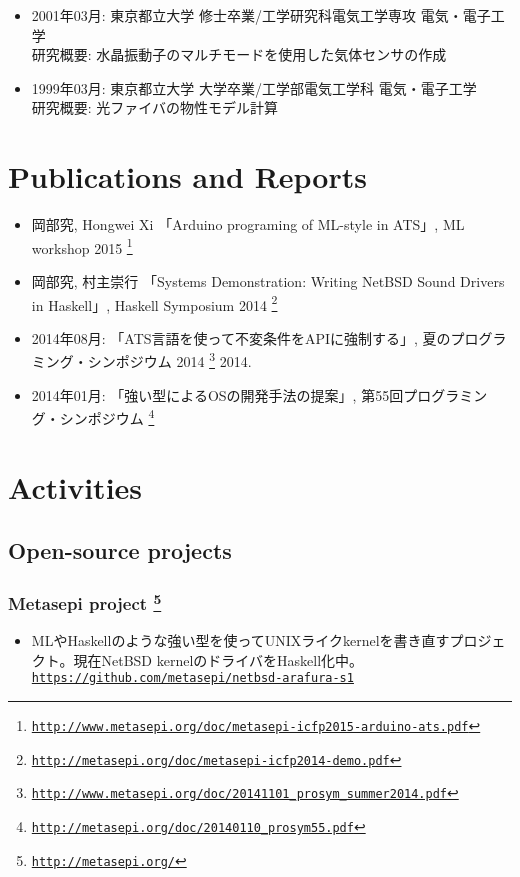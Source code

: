 \documentclass[letterpaper]{article}
\begin{document}
\begin{itemize}
  \item 2001年03月: 東京都立大学 修士卒業/工学研究科電気工学専攻 電気・電子工学 \\
    研究概要: 水晶振動子のマルチモードを使用した気体センサの作成
  \item 1999年03月: 東京都立大学 大学卒業/工学部電気工学科 電気・電子工学 \\
    研究概要: 光ファイバの物性モデル計算
\end{itemize}

\section*{Publications and Reports}

\begin{itemize}
  \item 岡部究, Hongwei Xi 「Arduino programing of ML-style in ATS」, ML workshop 2015
    \footnote{\href{http://www.metasepi.org/doc/metasepi-icfp2015-arduino-ats.pdf}{\tt http://www.metasepi.org/doc/metasepi-icfp2015-arduino-ats.pdf}}
  \item 岡部究, 村主崇行 「Systems Demonstration: Writing NetBSD Sound Drivers in Haskell」, Haskell Symposium 2014
    \footnote{\href{http://metasepi.org/doc/metasepi-icfp2014-demo.pdf}{\tt http://metasepi.org/doc/metasepi-icfp2014-demo.pdf}}
  \item 2014年08月: 「ATS言語を使って不変条件をAPIに強制する」, 夏のプログラミング・シンポジウム 2014
    \footnote{\href{http://www.metasepi.org/doc/20141101\_prosym\_summer2014.pdf}{\tt http://www.metasepi.org/doc/20141101\_prosym\_summer2014.pdf}}  2014.
  \item 2014年01月: 「強い型によるOSの開発手法の提案」, 第55回プログラミング・シンポジウム
    \footnote{\href{http://metasepi.org/doc/20140110\_prosym55.pdf}{\tt http://metasepi.org/doc/20140110\_prosym55.pdf}}
\end{itemize}

\section*{Activities}

\subsection*{Open-source projects}

\subsubsection*{Metasepi project \footnote{\href{http://metasepi.org/}{\tt http://metasepi.org/}}}
\begin{itemize}
\item MLやHaskellのような強い型を使ってUNIXライクkernelを書き直すプロジェクト。現在NetBSD kernelのドライバをHaskell化中。 \href{https://github.com/metasepi/netbsd-arafura-s1}{\tt https://github.com/metasepi/netbsd-arafura-s1}
\end{itemize}
\end{document}
